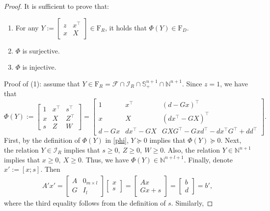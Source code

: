 \documentclass[11pt]{article}
\theoremstyle{plain}
\def\F{\mathcal{F}}
\def\I{\mathcal{I}}
\def\bN{\mathbb{N}}
\begin{document}
\begin{proof}
It is sufficient to prove that:
\begin{enumerate}
\item[(1)] For any $Y:=\begin{bmatrix}
z&x^\top\\
x&X
\end{bmatrix}\in{\mathrm{F}_R}$, it holds that $\Phi(Y)\in {\mathrm{F}_D}$.
\item[(2)] $\Phi$ is surjective.
\item[(3)] $\Phi$ is injective.
\end{enumerate}
Proof of (1): assume that $Y\in{\mathrm{F}_R}=\F\cap\I_R\cap \mathbb{S}_{+}^{n+1} \cap\mathbb{N}^{n+1}$. Since $z=1$, we have that  
\[
\Phi(Y):=\begin{bmatrix}
1&x^\top&s^\top\\
x&X&Z^\top\\
s&Z&W
\end{bmatrix}=\begin{bmatrix}
             1&x^\top&(d-Gx)^\top\\
             x&X&(dx^\top-GX)^\top\\
             d-Gx&dx^\top-GX&GXG^\top -Gxd^\top -dx^\top G^\top +dd^\top
         \end{bmatrix}.
\]
First, by the definition of $\Phi(Y)$ in \eqref{phi}, $Y\succeq 0$ implies that $\Phi(Y)\succeq 0$. Next, the relation $Y\in\I_R$ implies that $s\geq 0,\ Z\geq 0,\ W\geq 0$. Also, the relation $Y\in \mathbb{N}^{n+1}$ implies that $x\geq 0,\ X\geq 0$. Thus, we have $\Phi(Y)\in \bN^{n+l+1}$. Finally, denote $x':=[x;s]$. 
Then
\begin{equation*}
\begin{aligned}
A'x'
=\begin{bmatrix}
A&0_{m\times l}\\
 G&I_l
\end{bmatrix}\begin{bmatrix}
x\\s
\end{bmatrix}
=\begin{bmatrix}
Ax\\
Gx+s
\end{bmatrix}
=\begin{bmatrix}
b\\
d
\end{bmatrix}
=b', 
\end{aligned}
\end{equation*}
where the third equality follows from the definition of $s$. Similarly,

\end{proof}
\end{document}

